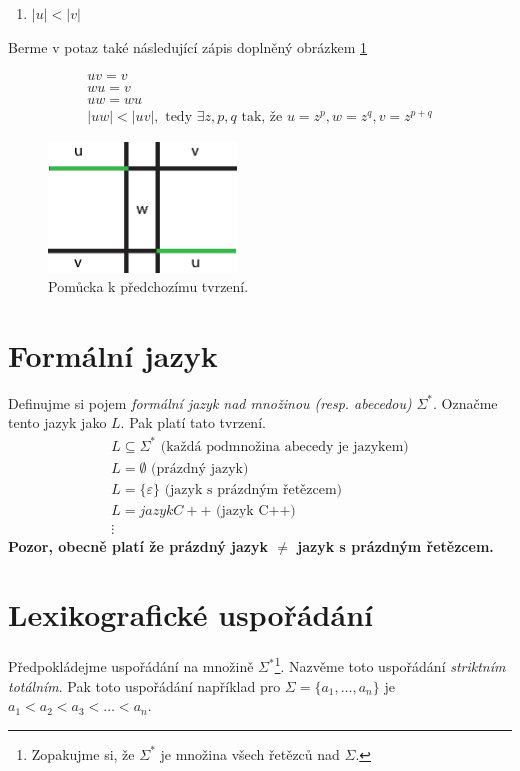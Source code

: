 \documentclass[10pt, a4paper, titlepage]{article}
\theoremstyle{note}
\begin{document}
\begin{itemize}
\begin{enumerate}
\item
$|u| < |v|$
\end{enumerate}

Berme v potaz také následující zápis doplněný obrázkem \ref{obr-1}

\begin{gather*}
uv = v \\
wu = v \\
uw = wu \\
|uw| < |uv|, \text{ tedy } \exists z, p, q  \text{ tak, že } u = z^{p}, w = z^{q}, v = z^{p+q}
\end{gather*}

\begin{figure}[ht]
\centering\includegraphics[width=5cm]{dukaz-1.eps}
\caption{Pomůcka k předchozímu tvrzení.}\label{obr-1}
\end{figure}
\end{itemize}

\section{Formální jazyk}
Definujme si pojem \emph{formální jazyk nad množinou (resp. abecedou)} $\Sigma^{*}$. Označme tento jazyk jako $L$. Pak platí tato tvrzení.
\begin{gather*}
L \subseteq \Sigma^{*} \text{ (každá podmnožina abecedy je jazykem)} \\
L = \emptyset \text{ (prázdný jazyk)} \\
L = \lbrace \varepsilon \rbrace \text{ (jazyk s prázdným řetězcem)} \\
L = jazyk C++ \text{ (jazyk C++)} \\
\vdots
\end{gather*}
\textbf{Pozor, obecně platí že prázdný jazyk $\neq$ jazyk s prázdným řetězcem.}
	
\section{Lexikografické uspořádání}
Předpokládejme uspořádání na množině $\Sigma^{*}$\footnote{Zopakujme si, že $\Sigma^{*}$ je množina všech řetězců nad $\Sigma$.}.
Nazvěme toto uspořádání \emph{striktním totálním}. Pak toto uspořádání například pro $\Sigma = \lbrace a_{1}, \ldots, a_{n} \rbrace$
je $a_{1} < a_{2} < a_{3} < \ldots < a_{n}$.
\end{document}
